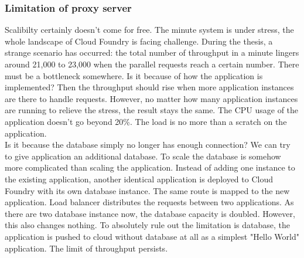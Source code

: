  \subsubsection{Limitation of proxy server}
 \label{haproxy}
Scalibilty certainly doesn't come for free. The minute system is under stress, the whole landscape of Cloud Foundry is facing challenge. During the thesis, a strange scenario has occurred: the total number of throughput in a minute lingers around 21,000 to 23,000 when the parallel requests reach a certain number. There must be a bottleneck somewhere. Is it because of how the application is implemented? Then the throughput should rise when more application instances are there to handle requests. However, no matter how many application instances are running to relieve the stress, the result stays the same.  The CPU usage of the application doesn't go beyond 20\%. The load is no more than a scratch on the application.\\
Is it because the database simply no longer has enough connection? We can try to give application an additional database. To scale the database is somehow more complicated than scaling the application. Instead of adding one instance to the existing application, another identical application is deployed to Cloud Foundry with its own database instance. The same route is mapped to the new application. Load balancer distributes the requests between two applications. As there are two database instance now, the database capacity is doubled. However, this also changes nothing. To absolutely rule out the limitation is database, the application is pushed to cloud without database at all as a simplest "Hello World" application. The limit of throughput persists. \\ 
